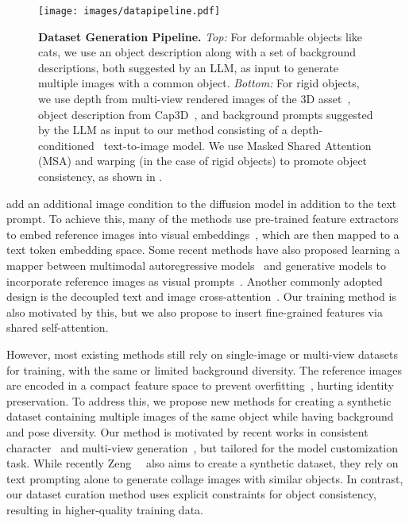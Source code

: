 \begin{figure*}[!t]
    \centering
    \texttt{[image: images/datapipeline.pdf]}
    \caption{{\textbf{Dataset Generation Pipeline.} \textit{Top:} For deformable objects like cats, we use an object description along with a set of background descriptions, both suggested by an LLM, as input to generate multiple images with a common object. \textit{Bottom:} For rigid objects, we use depth from multi-view rendered images of the 3D asset~\cite{deitke2023objaverse}, object description from Cap3D~\cite{luo2024scalable}, and background prompts suggested by the LLM as input to our method consisting of a depth-conditioned~\cite{zhang2023adding} text-to-image model. 
    We use Masked Shared Attention (MSA) and warping (in the case of rigid objects) to promote object consistency, as shown in . 
    }}
    \vspace{-10pt}
\end{figure*}


 add an additional image condition to the diffusion model in addition to the text prompt. To achieve this, many of the methods use pre-trained feature extractors to embed reference images into visual embeddings~\cite{li2023blip,song2024moma,wei2023elite,chen2024anydoor,xiao2024fastcomposer,parmar2025object}, which are then mapped to a text token embedding space. Some recent methods have also proposed learning a mapper between multimodal autoregressive models~\cite{touvron2023llama} and generative models to incorporate reference images as visual prompts~\cite{pan2023kosmos,Emu2}. Another commonly adopted design is the decoupled text and image cross-attention~\cite{ye2023ip,wei2023elite,ma2024subject}. Our training method is also motivated by this, but we also propose to insert fine-grained features via shared self-attention.

However, most existing methods still rely on single-image or multi-view datasets for training, with the same or limited background diversity. The reference images are encoded in a compact feature space to prevent overfitting~\cite{li2023blip,song2024moma}, hurting identity preservation. To address this, we propose new methods for creating a synthetic dataset containing multiple images of the same object while having background and pose diversity. %
Our method is motivated by recent works in consistent character~\cite{tewel2024training,zhou2024storydiffusion} and multi-view generation~\cite{shi2023mvdream,deng2024flashtex,shi2023zero123++}, but tailored for the model customization task. While recently Zeng~\etal~\cite{zeng2024jedi} also aims to create a synthetic dataset, they rely on text prompting alone to generate collage images with similar objects.
In contrast, our dataset curation method uses explicit constraints for object consistency, resulting in higher-quality training data. %


